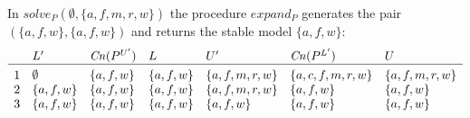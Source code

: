 \begin{Loesung}
{\begin{UList}
In $solve_P(\emptyset,\{a,f,m,r,w\})$ 
the procedure $expand_P$ generates the pair
$(\{a,f,w\},\{a,f,w\})$ 
and returns the stable model $\{a,f,w\}$:
\[
\begin{array}{c@{\hspace{10pt}}llllll}
& L' & \mathit{Cn}(P^{U'}) & L
& U' & \mathit{Cn}(P^{L'}) & U \\\hline\\[-3mm]
1 & \emptyset & \{a,f,w\} & \{a,f,w\} & \{a,f,m,r,w\} & \{a,c,f,m,r,w\} & \{a,f,m,r,w\} \\ 
2 & \{a,f,w\} & \{a,f,w\} & \{a,f,w\} & \{a,f,m,r,w\} & \{a,f,w\} & \{a,f,w\} \\ 
3 & \{a,f,w\} & \{a,f,w\} & \{a,f,w\} & \{a,f,w\} & \{a,f,w\} & \{a,f,w\} \\ 
\end{array}
\]

\end{UList}}
\end{Loesung}
